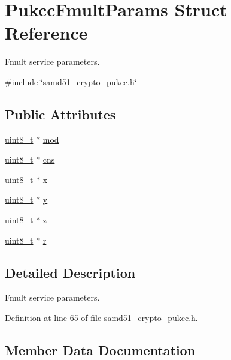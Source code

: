 \hypertarget{structPukccFmultParams}{}\section{Pukcc\+Fmult\+Params Struct Reference}
\label{structPukccFmultParams}


Fmult service parameters.  




{\ttfamily \#include \char`\"{}samd51\+\_\+crypto\+\_\+pukcc.\+h\char`\"{}}

\subsection*{Public Attributes}
\begin{DoxyCompactItemize}
\item 
\hyperlink{stdint_8h_aba7bc1797add20fe3efdf37ced1182c5}{uint8\+\_\+t} $\ast$ \hyperlink{structPukccFmultParams_a380f88e7540dcedab27ac1802ef06985}{mod}
\item 
\hyperlink{stdint_8h_aba7bc1797add20fe3efdf37ced1182c5}{uint8\+\_\+t} $\ast$ \hyperlink{structPukccFmultParams_ab1e0f083a649168a0836bf7c366d80c8}{cns}
\item 
\hyperlink{stdint_8h_aba7bc1797add20fe3efdf37ced1182c5}{uint8\+\_\+t} $\ast$ \hyperlink{structPukccFmultParams_ab8665adddab7eccfed10073e0e523a2a}{x}
\item 
\hyperlink{stdint_8h_aba7bc1797add20fe3efdf37ced1182c5}{uint8\+\_\+t} $\ast$ \hyperlink{structPukccFmultParams_ac5deea5a9a5fe96802a833f340417bf7}{y}
\item 
\hyperlink{stdint_8h_aba7bc1797add20fe3efdf37ced1182c5}{uint8\+\_\+t} $\ast$ \hyperlink{structPukccFmultParams_a9bbf57b29b0c6f8ee0d24b6e1d4cd150}{z}
\item 
\hyperlink{stdint_8h_aba7bc1797add20fe3efdf37ced1182c5}{uint8\+\_\+t} $\ast$ \hyperlink{structPukccFmultParams_a67b56fdd3a13e561b523af275d00e050}{r}
\end{DoxyCompactItemize}


\subsection{Detailed Description}
Fmult service parameters. 

Definition at line 65 of file samd51\+\_\+crypto\+\_\+pukcc.\+h.



\subsection{Member Data Documentation}
\mbox{\label{structPukccFmultParams_ab1e0f083a649168a0836bf7c366d80c8}} 
